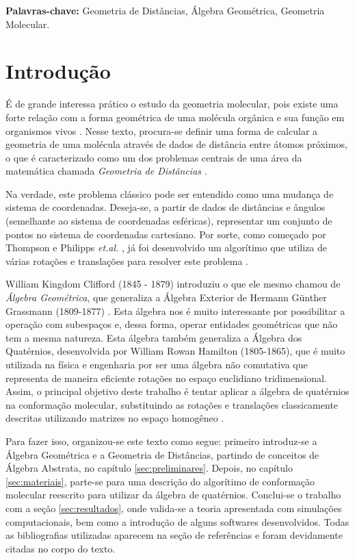 \documentclass[a4paper,12pt]{report}
\theoremstyle{plain}
\theoremstyle{definition}
\begin{document}
	\noindent\textbf{Palavras-chave:} Geometria de Distâncias, Álgebra Geométrica, Geometria Molecular.
	
	\newpage
	\chapter{Introdução}
	
	É de grande interessa prático o estudo da geometria molecular, pois existe uma forte relação com a forma geométrica de uma molécula orgânica e sua função em organismos vivos \cite{libertiEDG}. Nesse texto, procura-se definir uma forma de calcular a geometria de uma molécula através de dados de distância entre átomos próximos, o que é caracterizado como um dos problemas centrais de uma área da matemática chamada \textit{Geometria de Distâncias} \cite{carlileGDandAplications}.
	
	Na verdade, este problema clássico pode ser entendido como uma mudança de sistema de coordenadas. Deseja-se, a partir de dados de distâncias e ângulos (semelhante ao sistema de coordenadas esféricas), representar um conjunto de pontos no sistema de coordenadas cartesiano. Por sorte, como começado por Thompson \cite{thompsonBi} e Philipps \textit{et.al.} \cite{phillips1995molecular}, já foi desenvolvido um algorítimo que utiliza de várias rotações e translações para resolver este problema \cite{carlile:DMDGP,carlile:BP}.
	
	William Kingdom Clifford (1845 - 1879) introduziu o que ele mesmo chamou de \textit{Álgebra Geométrica}, que generaliza a Álgebra Exterior de Hermann Günther Grassmann (1809-1877) \cite{dorst2010geometric}. Esta álgebra nos é muito interessante por possibilitar a operação com subespaços e, dessa forma, operar entidades geométricas que não tem a mesma natureza. Esta álgebra também generaliza a Álgebra dos Quatérnios, desenvolvida por William Rowan Hamilton (1805-1865), que é muito utilizada na física e engenharia por ser uma álgebra não comutativa que representa de maneira eficiente rotações no espaço euclidiano tridimensional.
	Assim, o principal objetivo deste trabalho é tentar aplicar a álgebra de quatérnios na conformação molecular, substituindo as rotações e translações classicamente descritas utilizando matrizes no espaço homogêneo \cite{fidalgoAGACSE}.
	
	Para fazer isso, organizou-se este texto como segue: primeiro introduz-se a Álgebra Geométrica e a Geometria de Distâncias, partindo de conceitos de Álgebra Abstrata, no capítulo \ref{sec:preliminares}. Depois, no capítulo \ref{sec:materiais}, parte-se para uma descrição do algorítimo de conformação molecular reescrito para utilizar da álgebra de quatérnios. Conclui-se o trabalho com a seção \ref{sec:resultados}, onde valida-se a teoria apresentada com simulações computacionais, bem como a introdução de alguns softwares desenvolvidos. Todas as bibliografias utilizadas aparecem na seção de referências e foram devidamente citadas no corpo do texto.
	
\end{document}

